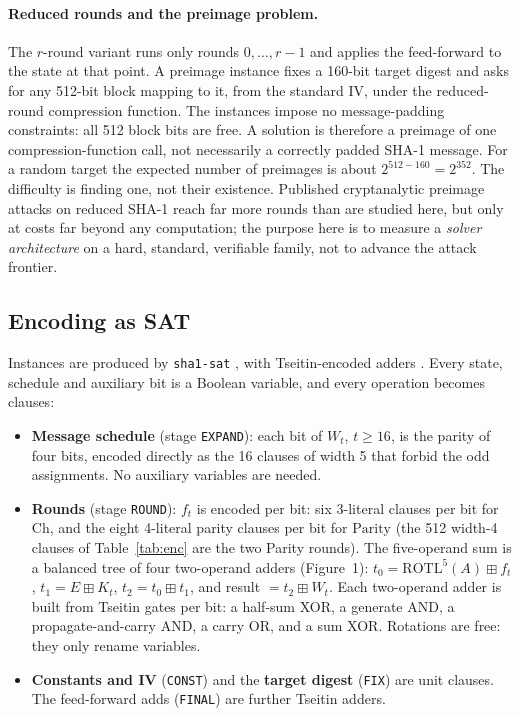 \documentclass[11pt,a4paper]{article}
\newcommand{\rotl}[1]{\mathrm{ROTL}^{#1}}
\begin{document}
\paragraph{Reduced rounds and the preimage problem.} The $r$-round variant runs only rounds
$0,\dots,r-1$ and applies the feed-forward to the state at that point. A preimage instance fixes a
160-bit target digest and asks for any 512-bit block mapping to it, from the standard IV, under the
reduced-round compression function. The instances impose no message-padding constraints: all 512
block bits are free. A solution is therefore a preimage of one compression-function call, not
necessarily a correctly padded SHA-1 message. For a random target the expected
number of preimages is about $2^{512-160}=2^{352}$. The difficulty is finding one, not their
existence. Published cryptanalytic preimage attacks on reduced SHA-1 reach far more rounds than are
studied here, but only at costs far beyond any computation; the purpose here is to measure a
\emph{solver architecture} on a hard, standard, verifiable family, not to advance the attack frontier.

\subsection{Encoding as SAT}

Instances are produced by \texttt{sha1-sat} \cite{nossum}, with Tseitin-encoded adders
\cite{tseitin}. Every state, schedule and auxiliary bit is a Boolean variable, and every operation
becomes clauses:
\begin{itemize}
\item \textbf{Message schedule} (stage \texttt{EXPAND}): each bit of $W_t$, $t\ge16$, is the parity
of four bits, encoded directly as the 16 clauses of width 5 that forbid the odd assignments. No
auxiliary variables are needed.
\item \textbf{Rounds} (stage \texttt{ROUND}): $f_t$ is encoded per bit: six 3-literal clauses per bit
for $\mathrm{Ch}$, and the eight 4-literal parity clauses per bit for $\mathrm{Parity}$ (the 512
width-4 clauses of Table~\ref{tab:enc} are the two Parity rounds). The five-operand sum is a balanced
tree of four two-operand adders (Figure~1): $t_0=\rotl{5}(A)\boxplus f_t$, $t_1=E\boxplus K_t$,
$t_2=t_0\boxplus t_1$, and result $=t_2\boxplus W_t$. Each two-operand adder is built from Tseitin gates per bit: a half-sum
XOR, a generate AND, a propagate-and-carry AND, a carry OR, and a sum XOR. Rotations are free: they
only rename variables.
\item \textbf{Constants and IV} (\texttt{CONST}) and the \textbf{target digest} (\texttt{FIX}) are
unit clauses. The feed-forward adds (\texttt{FINAL}) are further Tseitin adders.
\end{itemize}
\end{document}

